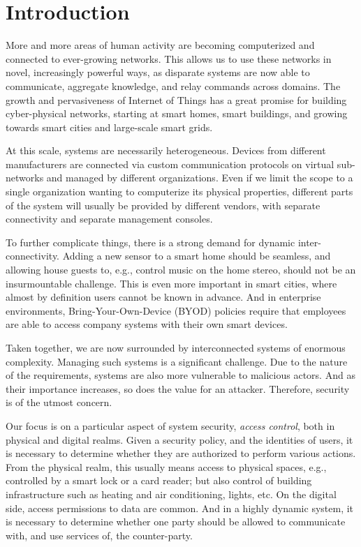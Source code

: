 \chapter{Introduction}

More and more areas of human activity are becoming computerized and connected to
ever-growing networks. This allows us to use these networks in novel, increasingly
powerful ways, as disparate systems are now able to communicate, aggregate knowledge,
and relay commands across domains. The growth and pervasiveness of Internet of Things
has a great promise for building cyber-physical networks, starting at smart homes,
smart buildings, and growing towards smart cities and large-scale smart grids.

At this scale, systems are necessarily heterogeneous. Devices from different
manufacturers are connected via custom communication protocols on virtual sub-networks
and managed by different organizations. Even if we limit the scope to a single
organization wanting to computerize its physical properties, different parts of the
system will usually be provided by different vendors, with separate connectivity and
separate management consoles.

To further complicate things, there is a strong demand for dynamic inter-connectivity.
Adding a new sensor to a smart home should be seamless, and allowing house guests to,
e.g., control music on the home stereo, should not be an insurmountable challenge. This
is even more important in smart cities, where almost by definition users cannot be known
in advance. And in enterprise environments, Bring-Your-Own-Device (BYOD) policies
require that employees are able to access company systems with their own smart devices.

Taken together, we are now surrounded by interconnected systems of enormous complexity.
Managing such systems is a significant challenge. Due to the nature of the requirements,
systems are also more vulnerable to malicious actors. And as their importance increases,
so does the value for an attacker. Therefore, security is of the utmost concern.

\bigskip

Our focus is on a particular aspect of system security, \textit{access control}, both in
physical and digital realms. Given a security policy, and the identities of users, it is
necessary to determine whether they are authorized to perform various actions. From the
physical realm, this usually means access to physical spaces, e.g., controlled by a
smart lock or a card reader; but also control of building infrastructure such as heating
and air conditioning, lights, etc. On the digital side, access permissions to data are
common. And in a highly dynamic system, it is necessary to determine whether one party
should be allowed to communicate with, and use services of, the counter-party.

